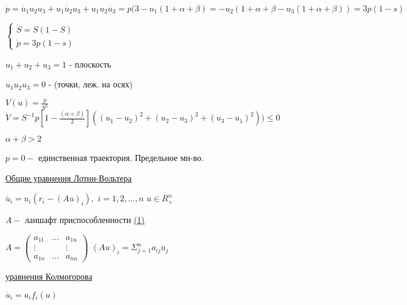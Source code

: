 \documentclass{article}
\begin{document}
\begin{large}
\vspace{0.5cm}
\(
\dot{p} = \dot{u_1}u_2u_3 + u_1\dot{u_2}u_3+u_1u_2\dot{u_3}=p(3-u_1(1+\alpha + \beta)=-u_2(1+\alpha+\beta - u_3(1+\alpha + \beta)) = 3p(1-s)
\)

\newpage
\(
	\begin{cases}
	\dot{S} = S(1-S)
	\\
	\dot{p} = 3p(1-s)
	\end{cases}
\)

\vspace{0.5cm}
\(
u_1 + u_2 +u_3 = 1
\) - плоскость

\vspace{0.5cm}
\(
u_1u_2u_3 = 0
\) - (точки, леж. на осях)

\vspace{0.5cm}
\(
V(u) = \frac{p}{S^3}
\) \hspace{0.2cm}
\(
\dot{V} = S^{-1}p \left[ 1 - \frac{(\alpha + \beta)}{2} \right]((u_1 - u_2)^2 + (u_2-u_3)^2 +(u_3-u_1)^2))\leq 0
\)

\vspace{0.5cm}
\(
\alpha + \beta > 2
\)

\vspace{0.5cm}
\(
 p = 0 - 
\) единственная траектория. Предельное мн-во.

\vspace{0.5cm}
\underline{Общие уравнения Лотни-Вольтера}

\vspace{0.5cm}
\(
\dot{u_i} = u_i(r_i-(Au)_i) , 
\)\hspace{0.2cm}
\(
i = 1,2,...,n
\)
\hspace{0.2cm}
\(
u \in R_+^n
\)


\vspace{0.5cm}
\(
A - 
\) ланшафт приспособленности \underline{(1)}


\vspace{0.5cm}
\(
A = 
	\begin{pmatrix}
	a_11 & \ldots & a_{1n} \\
	\vdots & & \vdots \\
	a_{1n} & \ldots & a_{nn}
	\end{pmatrix}
\)\hspace{0.7cm}
\(
(Au)_i = \Sigma_{j=1}^n a_{ij}u_j
\)

\vspace{0.5cm}
\underline{уравнения Колмогорова}

\vspace{0.5cm}
\(
\dot{u_i} = u_if_i(u)
\)


\end{large}
\end{document}
